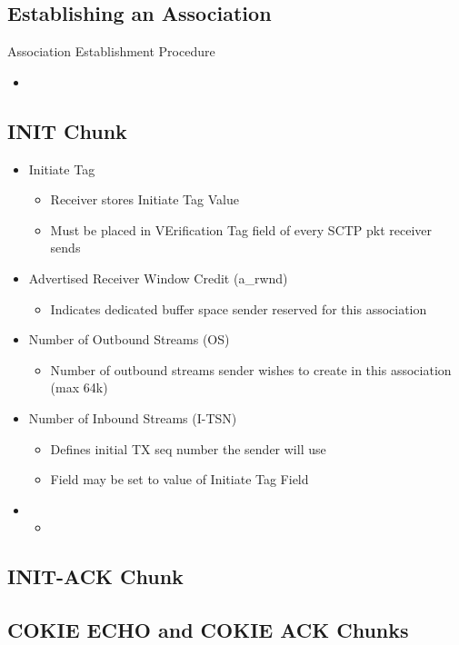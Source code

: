\subsection{Establishing an Association}
Association Establishment Procedure
\begin{itemize}
	\item
\end{itemize}
\subsection{INIT Chunk}
\begin{itemize}
	\item Initiate Tag
	\begin{itemize}
		\item Receiver stores Initiate Tag Value
		\item Must be placed in VErification Tag field of every SCTP pkt
			receiver sends
	\end{itemize}
\item Advertised Receiver Window Credit (a\_rwnd)
	\begin{itemize}
		\item Indicates dedicated buffer space sender reserved for this
			association
	\end{itemize}
\item Number of Outbound Streams (OS)
	\begin{itemize}
		\item Number of outbound streams sender wishes to create in this
			association (max 64k)
	\end{itemize}
\item Number of Inbound Streams (I-TSN)
	\begin{itemize}
		\item Defines initial TX seq number the sender will use
		\item Field may be set to value of Initiate Tag Field
	\end{itemize}
	\item
	\begin{itemize}
		\item
	\end{itemize}
\end{itemize}
\subsection{INIT-ACK Chunk}
\subsection{COKIE ECHO and COKIE ACK Chunks}
